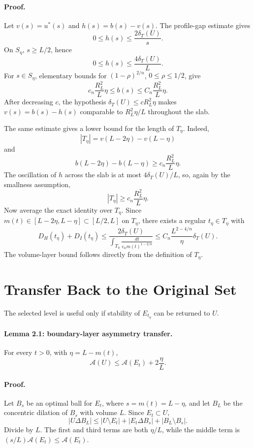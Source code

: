 \documentclass[11pt]{article}
\begin{document}
\paragraph{Proof.}
Let \(v(s)=u^*(s)\) and \(h(s)=b(s)-v(s)\). The profile-gap estimate gives
\[
0\le h(s)\le \frac{2\delta_T(U)}{s}.
\]
On \(S_\eta\), \(s\ge L/2\), hence
\[
0\le h(s)\le \frac{4\delta_T(U)}{L}.
\]
For \(s\in S_\eta\), elementary bounds for \((1-\rho)^{2/n}\),
\(0\le \rho\le 1/2\), give
\[
c_n\frac{R_L^2}{L}\eta
\le b(s)\le
C_n\frac{R_L^2}{L}\eta.
\]
After decreasing \(c\), the hypothesis
\(\delta_T(U)\le c R_L^2\eta\) makes \(v(s)=b(s)-h(s)\) comparable to
\(R_L^2\eta/L\) throughout the slab.

The same estimate gives a lower bound for the length of \(T_\eta\). Indeed,
\[
|T_\eta|
=v(L-2\eta)-v(L-\eta)
\]
and
\[
b(L-2\eta)-b(L-\eta)\ge c_n\frac{R_L^2}{L}\eta.
\]
The oscillation of \(h\) across the slab is at most \(4\delta_T(U)/L\), so,
again by the smallness assumption,
\[
|T_\eta|\ge c_n\frac{R_L^2}{L}\eta.
\]
Now average the exact identity over \(T_\eta\). Since
\(m(t)\in[L-2\eta,L-\eta]\subset[L/2,L]\) on \(T_\eta\), there exists a
regular \(t_\eta\in T_\eta\) with
\[
D_H(t_\eta)+D_I(t_\eta)
\le
\frac{2\delta_T(U)}
{\int_{T_\eta}\frac{dt}{c_n m(t)^{1-2/n}}}
\le
C_n\frac{L^{2-4/n}}{\eta}\delta_T(U).
\]
The volume-layer bound follows directly from the definition of \(T_\eta\).

\section{Transfer Back to the Original Set}

The selected level is useful only if stability of \(E_{t_\eta}\) can be
returned to \(U\).

\paragraph{Lemma 2.1: boundary-layer asymmetry transfer.}
For every \(t>0\), with \(\eta=L-m(t)\),
\[
\mathcal A(U)\le \mathcal A(E_t)+2\frac{\eta}{L}.
\]

\paragraph{Proof.}
Let \(B_s\) be an optimal ball for \(E_t\), where \(s=m(t)=L-\eta\), and let
\(B_L\) be the concentric dilation of \(B_s\) with volume \(L\). Since
\(E_t\subset U\),
\[
|U\Delta B_L|
\le |U\setminus E_t|+|E_t\Delta B_s|+|B_L\setminus B_s|.
\]
Divide by \(L\). The first and third terms are both \(\eta/L\), while the
middle term is \((s/L)\mathcal A(E_t)\le \mathcal A(E_t)\).
\end{document}
